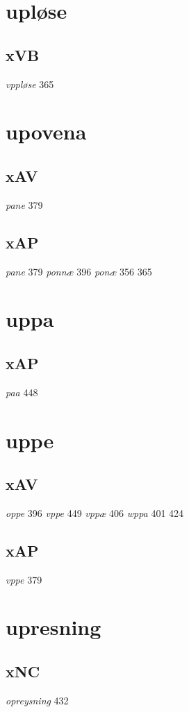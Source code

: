 \documentclass[a4paper,twocolumn]{article}
\begin{document}
\section{upløse}
\label{sec:org187da8d}
\subsection{xVB}
\label{sec:org9778292}
\emph{vppløse} 365 
\section{upovena}
\label{sec:orgaae483c}
\subsection{xAV}
\label{sec:org1e5d616}
\emph{pane} 379 
\subsection{xAP}
\label{sec:org4cba050}
\emph{pane} 379 \emph{ponnæ} 396 \emph{ponæ} 356 365 
\section{uppa}
\label{sec:org6adc0d2}
\subsection{xAP}
\label{sec:orgd5b444a}
\emph{paa} 448 
\section{uppe}
\label{sec:orga2ade97}
\subsection{xAV}
\label{sec:org84d98de}
\emph{oppe} 396 \emph{vppe} 449 \emph{vppæ} 406 \emph{wppa} 401 424 
\subsection{xAP}
\label{sec:orgccc1a3f}
\emph{vppe} 379 
\section{upresning}
\label{sec:org616226b}
\subsection{xNC}
\label{sec:orgc2ad610}
\emph{opreysning} 432 
\end{document}
